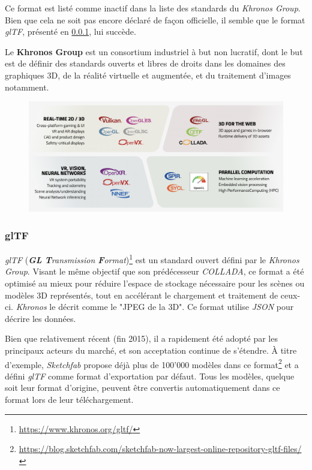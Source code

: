Ce format est listé comme inactif dans la liste des standards du \textit{Khronos Group}. 
Bien que cela ne soit pas encore déclaré de façon officielle, il semble que le format \textit{glTF}, présenté en \ref{sec:glTF}, lui succède.

Le \textbf{Khronos Group} est un consortium industriel à but non lucratif, dont le but est de définir des standards ouverts et libres de droits dans les domaines des graphiques 3D, de la réalité virtuelle et augmentée, et du traitement d'images notamment.

\begin{figure}
    \centering
    \includegraphics[width=0.8\linewidth]{Figures/khronos-visual-computing-ecosystem.png}
    \label{fig:khronos-visual-computing-ecosystem}
\end{figure}

\subsubsection{glTF}
\label{sec:glTF}

\textit{glTF} (\textit{\textbf{GL} \textbf{T}ransmission \textbf{F}ormat})\footnote{\url{https://www.khronos.org/gltf/}} est un standard ouvert défini par le \textit{Khronos Group}. Visant le même objectif que son prédécesseur \textit{COLLADA}, ce format a été optimisé au mieux pour réduire l'espace de stockage nécessaire pour les scènes ou modèles 3D représentés, tout en accélérant le chargement et traitement de ceux-ci. 
\textit{Khronos} le décrit comme le "JPEG de la 3D".
Ce format utilise \textit{JSON} pour décrire les données.

Bien que relativement récent (fin 2015), il a rapidement été adopté par les principaux acteurs du marché, et son acceptation continue de s'étendre. À titre d'exemple, \textit{Sketchfab} propose déjà plus de 100'000 modèles dans ce format\footnote{\url{https://blog.sketchfab.com/sketchfab-now-largest-online-repository-gltf-files/}} et a défini \textit{glTF} comme format d'exportation par défaut. Tous les modèles, quelque soit leur format d'origine, peuvent être convertis automatiquement dans ce format lors de leur téléchargement. 


